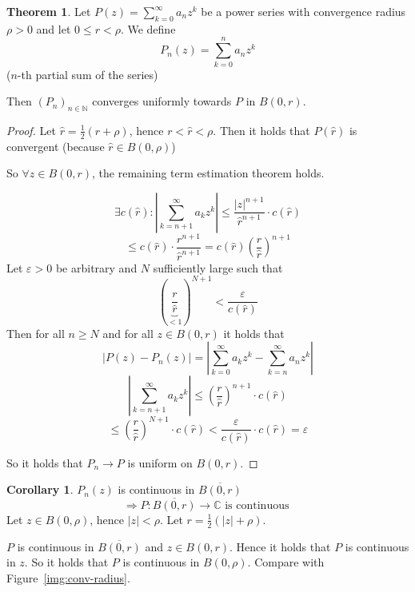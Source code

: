 \documentclass[a4paper,landscape,twocolumn]{article}
\theoremstyle{definition}
\newtheorem{theorem}{Theorem}
\newtheorem{cor}{Corollary}
\newcommand\abs[1]{\left|#1\right|}
\begin{document}
\begin{theorem}
  Let $P(z) = \sum_{k=0}^\infty a_n z^k$ be a power series with convergence radius
  $\rho > 0$ and let $0 \leq r < \rho$. We define
  \[ P_n(z) = \sum_{k=0}^n a_n z^k \]
  ($n$-th partial sum of the series)

  Then $(P_n)_{n\in\mathbb N}$ converges uniformly towards $P$ in $B(0,r)$.
\end{theorem}
\begin{proof}
  Let $\hat{r} = \frac12 (r + \rho)$, hence $r < \hat{r} < \rho$.
  Then it holds that $P(\hat{r})$ is convergent (because $\hat{r} \in B(0,\rho)$)

  So $\forall z \in B(0, r)$, the remaining term estimation theorem holds.

  \[
    \exists c(\hat{r}):
    \abs{\sum_{k=n+1}^\infty a_k z^k} \leq \frac{\abs{z}^{n+1}}{\hat{r}^{n+1}} \cdot c(\hat{r})
  \] \[
    \leq c(\hat{r}) \cdot \frac{r^{n+1}}{\hat{r}^{n+1}} = c(\hat{r}) \left(\frac{r}{\hat{r}}\right)^{n+1}
  \]
  Let $\varepsilon > 0$ be arbitrary and $N$ sufficiently large such that
  \[ \left(\underbrace{\frac{r}{\hat r}}_{<1}\right)^{N+1} < \frac{\varepsilon}{c(\hat r)} \]
  Then for all $n \geq N$ and for all $z \in B(0, r)$ it holds that
  \[ \abs{P(z) - P_n(z)} = \abs{\sum_{k=0}^\infty a_k z^k - \sum_{k=n}^\infty a_n z^k} \]
  \[ \abs{\sum_{k=n+1}^\infty a_k z^k} \leq \left(\frac{r}{\hat r}\right)^{n+1} \cdot c(\hat r) \]
  \[ \leq \left(\frac r{\hat{r}}\right)^{N+1} \cdot c(\hat r) < \frac{\varepsilon}{c(\hat r)} \cdot c(\hat r) = \varepsilon \]

  So it holds that $P_n \to P$ is uniform on $B(0, r)$.
\end{proof}

\begin{cor}
  $P_n(z)$ is continuous in $\overline{B(0, r)}$
  \[ \Rightarrow P: \overline{B(0, r)} \rightarrow \mathbb C \text{ is continuous }  \]
  Let $z \in B(0, \rho)$, hence $\abs{z} < \rho$. Let $r = \frac12 (\abs{z} + \rho)$.

  $P$ is continuous in $\overline{B(0,r)}$ and $z \in B(0,r)$. Hence it holds that
  $P$ is continuous in $z$. So it holds that $P$ is continuous in $B(0, \rho)$.
  Compare with Figure~\ref{img:conv-radius}.
\end{cor}
\end{document}
